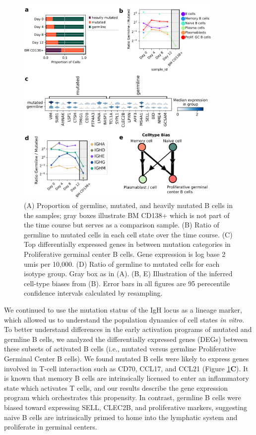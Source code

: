 \begin{figure}[hbt!]
\centering
\includegraphics[width=10cm, keepaspectratio]{figs/InVitro/fig2_bcd.png}
\caption[Characterization of cell-intrinsic phenotypes using VDJ mutation status.]{(A) Proportion of germline, mutated, and heavily mutated B cells in the samples; gray boxes illustrate BM CD138+ which is not part of the time course but serves as a comparison sample. (B) Ratio of germline to mutated cells in each cell state over the time course. (C) Top differentially expressed genes in between mutation categories in Proliferative germinal center B cells. Gene expression is log base 2 umis per 10,000. (D) Ratio of germline to mutated cells for each isotype group. Gray box as in (A). (B, E) Illustration of the inferred cell-type biases from (B). Error bars in all figures are 95 perecentile confidence intervals calculated by resampling.}
\label{fig:paper2_fig_2}
\end{figure}

We continued to use the mutation status of the IgH locus as a lineage marker, which allowed us to understand the population dynamics of cell states \textit{in vitro}. To better understand differences in the early activation programs of mutated and germline B cells, we analyzed the differentially expressed genes (DEGs) between these subsets of activated B cells (i.e., mutated versus germline Proliferative Germinal Center B cells). We found mutated B cells were likely to express genes involved in T-cell interaction such as CD70, CCL17, and CCL21 (Figure \ref{fig:paper2_fig_2}\textbf{C}). It is known that memory B cells are intrinsically licensed to enter an inflammatory state which activates T cells\cite{liu_memory_1995, good_resting_2009}, and our results describe the gene expression program which orchestrates this propensity. In contrast, germline B cells were biased toward expressing SELL, CLEC2B, and proliferative markers, suggesting naive B cells are intrinsically primed to home into the lymphatic system and proliferate in germinal centers.

